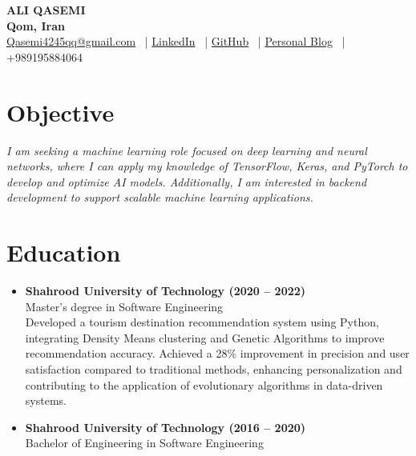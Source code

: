 \documentclass[10pt, letterpaper]{article}
\newcommand{\icon}[1]{{\small #1}}
\begin{document}
\begin{center}
    \fontsize{30pt}{36pt}\textbf{ALI QASEMI} \\[0.2cm]
    \fontsize{12pt}{14pt}\color{secondaryColor}\textbf{Qom, Iran} \\[0.3cm]
    \href{mailto:Qasemi4245qq@gmail.com}{\icon{\faEnvelope[regular]} Qasemi4245qq@gmail.com} \ |
    \href{https://www.linkedin.com/in/aliqasemi/}{\icon{\faLinkedin} LinkedIn} \ |
    \href{https://github.com/aliqasemi}{\icon{\faGithub} GitHub} \ |
    \href{http://aliqasemi.github.io/}{\icon{\faLink} Personal Blog} \ |
    \icon{\faPhone} +989195884064
\end{center}

\section{Objective}
\textit{I am seeking a machine learning role focused on deep learning and neural networks, where I can apply my knowledge of TensorFlow, Keras, and PyTorch to develop and optimize AI models. Additionally, I am interested in backend development to support scalable machine learning applications.}

\section{Education}
\begin{itemize}[leftmargin=*]
    \item \textbf{Shahrood University of Technology (2020 -- 2022)} \\
    Master's degree in Software Engineering \\
    Developed a tourism destination recommendation system using Python, integrating Density Means clustering and Genetic Algorithms to improve recommendation accuracy. Achieved a 28\% improvement in precision and user satisfaction compared to traditional methods, enhancing personalization and contributing to the application of evolutionary algorithms in data-driven systems.
    \item \textbf{Shahrood University of Technology (2016 -- 2020)} \\
    Bachelor of Engineering in Software Engineering
\end{itemize}

\end{document}

